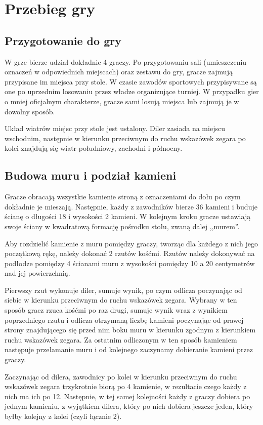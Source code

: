 \section{Przebieg gry}
\subsection{Przygotowanie do gry}
W grze bierze udział dokładnie 4 graczy. Po przygotowaniu sali (umieszczeniu
oznaczeń w odpowiednich miejscach) oraz zestawu do gry, gracze zajmują
przypisane im miejsca przy stole. W czasie zawodów sportowych przypisywane są
one po uprzednim losowaniu przez władze organizujące turniej. W przypadku gier o
mniej oficjalnym charakterze, gracze sami losują miejsca lub zajmują je w
dowolny sposób. %

Układ wiatrów miejsc przy stole jest ustalony. Diler zasiada na miejscu
wschodnim, następnie w kierunku przeciwnym do ruchu wskazówek zegara po kolei
znajdują się wiatr południowy, zachodni i północny.

\subsection{Budowa muru i podział kamieni}
Gracze obracają wszystkie kamienie stroną z oznaczeniami do dołu po czym
dokładnie je mieszają. Następnie, każdy z zawodników bierze 36 kamieni i buduje
ścianę o długości 18 i wysokości 2 kamieni. W kolejnym kroku gracze ustawiają
swoje ściany w kwadratową formację pośrodku stołu, zwaną dalej ,,murem''.

Aby rozdzielić kamienie z muru pomiędzy graczy, tworząc dla każdego z nich jego
początkową rękę, należy dokonać 2 rzutów kośćmi. Rzutów należy dokonywać na
podłodze pomiędzy 4 ścianami muru z wysokości pomiędzy 10 a 20 centymetrów nad
jej powierzchnią. 

Pierwszy rzut wykonuje diler, sumuje wynik, po czym odlicza poczynając od siebie
w kierunku przeciwnym do ruchu wskazówek zegara. Wybrany w ten sposób gracz
rzuca kośćmi po raz drugi, sumuje wynik wraz z wynikiem poprzedniego
rzutu i odlicza otrzymaną liczbę kamieni poczynając od prawej strony
znajdującego się przed nim boku muru w kierunku zgodnym z kierunkiem ruchu
wskazówek zegara. Za ostatnim odliczonym w ten sposób kamieniem następuje
przełamanie muru i od kolejnego zaczynamy dobieranie kamieni przez graczy.

Zaczynając od dilera, zawodnicy po kolei w kierunku przeciwnym do ruchu
wskazówek zegara trzykrotnie biorą po 4 kamienie, w rezultacie czego każdy z
nich ma ich po 12. Następnie, w tej samej kolejności każdy z graczy dobiera po
jednym kamieniu, z wyjątkiem dilera, który po nich dobiera jeszcze jeden, który
byłby kolejny z kolei (czyli łącznie 2).

